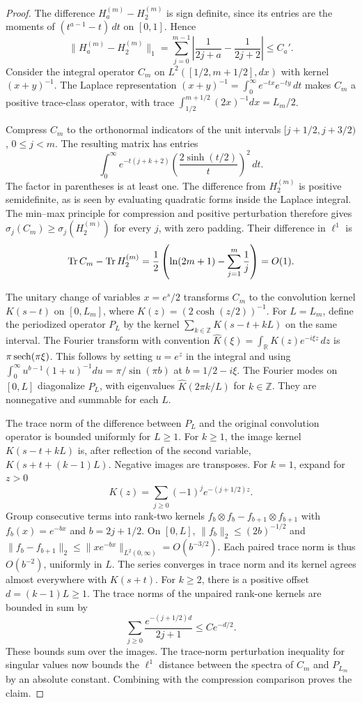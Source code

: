 \begin{proof}
The difference $H_a^{(m)}-H_2^{(m)}$ is sign definite, since its
entries are the moments of $(t^{a-1}-t)\,dt$ on $[0,1]$. Hence
\[
\|H_a^{(m)}-H_2^{(m)}\|_1
=\sum_{j=0}^{m-1}\left|\frac1{2j+a}-\frac1{2j+2}\right|
\le C_a'.
\]
Consider the integral operator $C_m$ on
$L^2([1/2,m+1/2],dx)$ with kernel $(x+y)^{-1}$. The Laplace
representation
$(x+y)^{-1}=\int_0^\infty e^{-t x}e^{-t y}\,dt$ makes $C_m$ a
positive trace-class operator, with trace
$\int_{1/2}^{m+1/2}(2x)^{-1}dx=L_m/2$.

Compress $C_m$ to the orthonormal indicators of the unit intervals
$[j+1/2,j+3/2)$, $0\le j<m$. The resulting matrix has entries
\[
\int_0^\infty e^{-t(j+k+2)}
\left(\frac{2\sinh(t/2)}{t}\right)^2\,dt.
\]
The factor in parentheses is at least one. The difference from
$H_2^{(m)}$ is positive semidefinite, as is seen by evaluating
quadratic forms inside the Laplace integral. The min--max principle
for compression and positive perturbation therefore gives
$\sigma_j(C_m)\ge\sigma_j(H_2^{(m)})$ for every $j$, with zero
padding. Their difference in $\ell^1$ is
\[
\operatorname{Tr} C_m-\operatorname{Tr} H_2^{(m)}
=\frac12\left(\ln(2m+1)-\sum_{j=1}^m\frac1j\right)=O(1).
\]

The unitary change of variables $x=e^s/2$ transforms $C_m$ to the
convolution kernel $K(s-t)$ on $[0,L_m]$, where
$K(z)=(2\cosh(z/2))^{-1}$. For $L=L_m$, define the periodized
operator $P_L$ by the kernel $\sum_{k\in\mathbb Z}K(s-t+kL)$ on
the same interval. The Fourier transform with convention
$\widehat K(\xi)=\int_{\mathbb R}K(z)e^{-i\xi z}\,dz$ is
$\pi\operatorname{sech}(\pi\xi)$. This follows by setting $u=e^z$ in the
integral and using
$\int_0^\infty u^{b-1}(1+u)^{-1}du=\pi/\sin(\pi b)$ at
$b=1/2-i\xi$. The Fourier modes on $[0,L]$ diagonalize $P_L$,
with eigenvalues $\widehat K(2\pi k/L)$ for $k\in\mathbb Z$.
They are nonnegative and summable for each $L$.

The trace norm of the difference between $P_L$ and the original
convolution operator is bounded uniformly for $L\ge1$. For
$k\ge1$, the image kernel $K(s-t+kL)$ is, after reflection of the
second variable, $K(s+t+(k-1)L)$. Negative images are transposes.
For $k=1$, expand for $z>0$
\[
K(z)=\sum_{j\ge0}(-1)^j e^{-(j+1/2)z}.
\]
Group consecutive terms into rank-two kernels
$f_b\otimes f_b-f_{b+1}\otimes f_{b+1}$ with
$f_b(x)=e^{-b x}$ and $b=2j+1/2$. On $[0,L]$,
$\|f_b\|_2\le (2b)^{-1/2}$ and
$\|f_b-f_{b+1}\|_2\le\|x e^{-b x}\|_{L^2(0,\infty)}=O(b^{-3/2})$.
Each paired trace norm is thus $O(b^{-2})$, uniformly in $L$.
The series converges in trace norm and its kernel agrees almost
everywhere with $K(s+t)$. For $k\ge2$, there is a positive offset
$d=(k-1)L\ge1$. The trace norms of the unpaired rank-one kernels
are bounded in sum by
\[
\sum_{j\ge0}\frac{e^{-(j+1/2)d}}{2j+1}\le C e^{-d/2}.
\]
These bounds sum over the images. The trace-norm perturbation
inequality for singular values now bounds the $\ell^1$ distance
between the spectra of $C_m$ and $P_{L_m}$ by an absolute constant.
Combining with the compression comparison proves the claim.
\end{proof}

